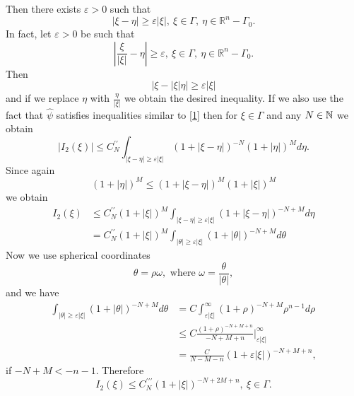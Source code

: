 \documentclass[12pt,reqno]{amsart}
\newcommand{\rr}{\mathbb{R}}
\theoremstyle{plain}  %
\theoremstyle{definition}
\begin{document}
Then there exists $ \varepsilon > 0 $ such that
$$|\xi - \eta| \ge \varepsilon |\xi|, \ \xi \in \Gamma, \ \eta \in \rr^n -
\Gamma_0.$$
In fact, let $ \varepsilon > 0$ be such that
$$ \left | \frac{\xi}{|\xi|} - \eta \right | \ge \varepsilon, \ \xi \in \Gamma, \ \eta
\in \rr^n - \Gamma_0. $$
Then
$$|\xi - |\xi| \eta| \ge \varepsilon |\xi|$$
and if we replace $ \eta $ with $ \frac{\eta}{|\xi|} $ we obtain the desired
inequality. 
\vskip0.1in
\noindent
If we also use the fact that $ \hat \psi $ satisfies inequalities
similar to \eqref{1} then for $ \xi \in \Gamma $ and any $ N \in \Bbb N $ we obtain
$$|I_2 (\xi)| \le C^{\prime \prime}_N \int_{|\xi - \eta| \ge \varepsilon |\xi|} (1 +
|\xi - \eta|)^{-N} (1 + |\eta|)^M d \eta.$$
Since again
$$(1 + |\eta|)^M \le (1 + |\xi - \eta|)^M (1 + |\xi|)^M$$
we obtain
\begin{equation*}
\begin{split}
I_2 (\xi) &\le C^{\prime \prime}_N (1 + |\xi|)^M \int_{|\xi - \eta| \ge
\varepsilon |\xi|} (1 + |\xi - \eta|)^{-N+M} d \eta\\
&= C^{\prime \prime}_N (1 + |\xi|)^M \int_{|\theta| \ge \varepsilon |\xi|} (1 +
|\theta|)^{-N+M} d \theta \end{split}
\end{equation*}
Now we use spherical coordinates
$$\theta = \rho \omega, \text{ where } \omega = \frac{\theta}{|\theta|}, $$
and we have
\begin{equation*}
\begin{split}
\int_{|\theta| \ge \varepsilon |\xi|} (1 + |\theta|)^{-N+M} d \theta &= C
\int^\infty_{\varepsilon |\xi|} (1 + \rho)^{-N+M} \rho^{n-1} d \rho\\
&\le C \frac{(1 + \rho)^{-N+M+n}}{-N +M +n} \bigg |^\infty_{\varepsilon |\xi|}\\
&= \frac{C}{N-M-n} (1 + \varepsilon  |\xi|)^{-N+M+n} ,\end{split}
\end{equation*}
if $ -N + M < -n -1$.  Therefore
$$I_2 (\xi) \le C^{\prime \prime \prime}_N (1 + |\xi|)^{-N+2M+n}, \ \xi \in
\Gamma. $$ 
\end{document}
